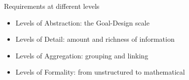 \begin{Slide}{Requirements at different levels}

\begin{itemize}
\item Levels of Abstraction: the Goal-Design scale 
\item Levels of Detail: amount and richness of information 
\item Levels of Aggregation: grouping and linking 
\item Levels of Formality: from unstructured to mathematical


\end{itemize}
\end{Slide}